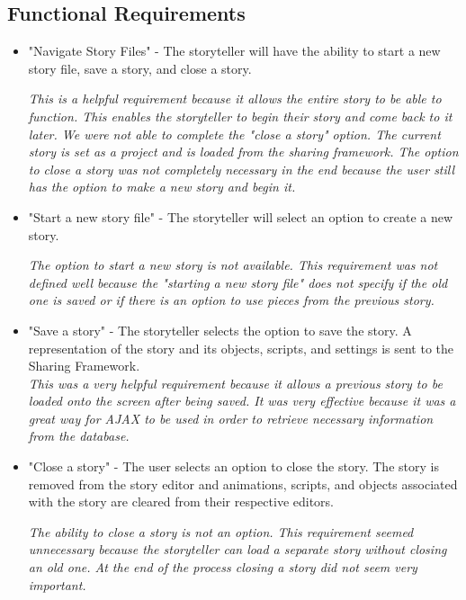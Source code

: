 \documentclass[12pt]{article}
\begin{document}
\subsection{Functional Requirements}
\begin{itemize}
\item "Navigate Story Files" - The storyteller will have the ability to start a new story file, save a story, and close a story.\

\textit{This is a helpful requirement because it allows the entire story to be able to function.  This enables the storyteller to begin their story and come back to it later.  We were not able to complete the "close a story" option.  The current story is set as a project and is loaded from the sharing framework.  The option to close a story was not completely necessary in the end because the user still has the option to make a new story and begin it.}

\item "Start a new story file" - The storyteller will select an option to create a new story.\

\textit{The option to start a new story is not available.  This requirement was not defined well because the "starting a new story file" does not specify if the old one is saved or if there is an option to use pieces from the previous story.}

\item "Save a story" - The storyteller selects the option to save the story.  A representation of the story and its objects, scripts, and settings is sent to the Sharing Framework.\\

\textit{This was a very helpful requirement because it allows a previous story to be loaded onto the screen after being saved.  It was very effective because it was a great way for AJAX to be used in order to retrieve necessary information from the database.}

\item "Close a story" -  The user selects an option to close the story.  The story is removed from the story editor and animations, scripts, and objects associated with the story are cleared from their respective editors.\

\textit{The ability to close a story is not an option.  This requirement seemed unnecessary because the storyteller can load a separate story without closing an old one.  At the end of the process closing a story did not seem very important.}


\end{itemize}
\end{document}
